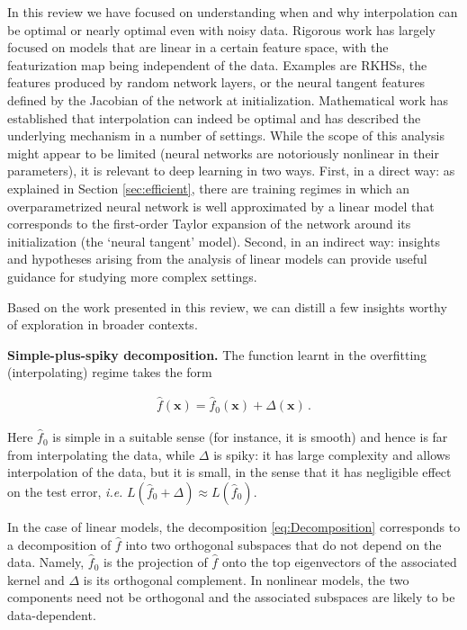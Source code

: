 In this review we have focused on understanding when and why interpolation can be optimal or nearly optimal even with noisy data.  Rigorous  work has largely focused on models that are linear in a certain feature space, with the featurization map being independent of the data. Examples are RKHSs, the features produced by random network layers, or the neural tangent features defined by the Jacobian of the network at initialization. Mathematical work has established that interpolation can indeed be optimal and has described the underlying mechanism in a number of settings. While the scope of this analysis might appear to be limited (neural networks are notoriously nonlinear in their parameters), it is relevant to deep learning in two ways. First, in a direct way: as explained in Section \ref{sec:efficient}, there are training regimes in which an overparametrized neural network is well approximated by a linear model that corresponds to the first-order Taylor expansion of the network around its initialization (the `neural tangent' model). Second, in an indirect way: insights and hypotheses arising from the analysis of linear models can provide useful guidance for studying more complex settings.

Based on the work presented in this review, we can distill a few insights worthy of exploration in broader contexts.

{\bf Simple-plus-spiky decomposition.} The function learnt in the overfitting (interpolating) regime takes the form

  \begin{align}
    {\widehat f} ({\boldsymbol x}) = {\widehat f}_0({\boldsymbol x})+\Delta({\boldsymbol x})\, .\label{eq:Decomposition}
  \end{align}

  Here ${\widehat f}_0$ is simple in a suitable sense (for instance, it is smooth) and hence is far from interpolating the data, while $\Delta$ is spiky: it has large complexity and allows interpolation of the data, but it is small, in the sense that it has negligible effect on the test error, \emph{i.e.} 
  ${L}({\widehat f}_0+\Delta)\approx {L}({\widehat f}_0)$.

  In the case of linear models, the decomposition \eqref{eq:Decomposition} corresponds to a decomposition of ${\widehat f}$ into two orthogonal subspaces that do not depend on the data. Namely,  ${\widehat f}_0$ is the projection of ${\widehat f}$ onto the top eigenvectors of the associated kernel and $\Delta$ is its orthogonal complement. In nonlinear models, the two components need not be orthogonal and the associated subspaces are likely to be data-dependent.

